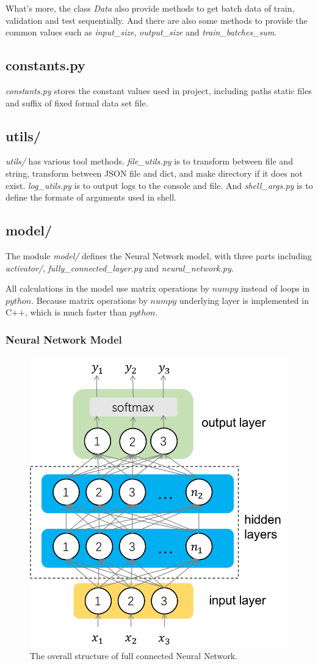 What's more, the class \textsl{Data} also provide methods to get batch data of train, validation and test sequentially. And there are also some methods to provide the common values such as \textsl{input\_size}, \textsl{output\_size} and \textsl{train\_batches\_sum}.

\subsection{constants.py}
\textsl{constants.py} stores the constant values used in project, including paths static files and suffix of fixed formal data set file. 

\subsection{utils/}
\textsl{utils/} has various tool methods. \textsl{file\_utils.py} is to transform between file and string, transform between JSON file and dict, and make directory if it does not exist. \textsl{log\_utils.py} is to output logs to the console and file. And \textsl{shell\_args.py} is to define the formate of arguments used in shell.

\subsection{model/}
The module \textsl{model/} defines the Neural Network model, with three parts including \textsl{activator/}, \textsl{fully\_connected\_layer.py} and \textsl{neural\_network.py}. 

All calculations in the model use matrix operations by \(numpy\) instead of loops in \(python\). Because matrix operations by \(numpy\) underlying layer is implemented in C++, which is much faster than \(python\).

\subsubsection{Neural Network Model}
\begin{figure}[htbp]
	\centering
	\includegraphics[width = .4\textwidth]{images/dnn.png}
	\caption{The overall structure of full connected Neural Network.}
	\label{fig:dnn}
\end{figure}

